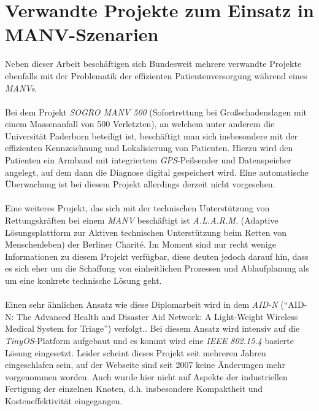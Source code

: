 \section{Verwandte Projekte zum Einsatz in MANV-Szenarien}\label{verwandte_projekte}
Neben dieser Arbeit beschäftigen sich Bundesweit mehrere verwandte Projekte ebenfalls mit der Problematik
der effizienten Patientenversorgung während eines \emph{MANVs}.\\
\\
Bei dem Projekt \emph{SOGRO MANV 500} (Sofortrettung bei Großschadenslagen mit einem Massenanfall von 500 Verletzten),
an welchem unter anderem die Universität Paderborn beteiligt ist, beschäftigt man sich insbesondere mit der effizienten
Kennzeichnung und Lokalisierung von Patienten. Hierzu wird den Patienten ein Armband mit integriertem \emph{GPS}-Peilsender 
und Datenspeicher angelegt, auf dem dann die Diagnose digital gespeichert wird. Eine automatische Überwachung ist bei
diesem Projekt allerdings derzeit nicht vorgesehen.\cite{sogro}\\
\\            
Eine weiteres Projekt, das sich mit der technischen Unterstützung von Rettungskräften bei einem \emph{MANV}
beschäftigt ist \emph{A.L.A.R.M.} (Adaptive Lösungsplattform zur Aktiven technischen Unterstützung beim Retten von 
Menschenleben) der Berliner Charité. Im Moment sind nur recht wenige Informationen zu diesem Projekt verfügbar, diese
deuten jedoch darauf hin, dass es sich eher um die Schaffung von einheitlichen Prozessen und Ablaufplanung als um eine
konkrete technische Lösung geht.\cite{alarm}\\
\\
Einen sehr ähnlichen Ansatz wie diese Diplomarbeit wird in dem \emph{AID-N} ("`AID-N: The Advanced Health and Disaster 
Aid Network: A Light-Weight Wireless Medical System for Triage"') verfolgt.\cite{aid-n}. Bei diesem Ansatz wird 
intensiv auf die \emph{TinyOS}-Platform aufgebaut und es kommt wird eine \emph{IEEE 802.15.4} basierte Lösung eingesetzt. 
Leider scheint dieses Projekt seit mehreren Jahren eingeschlafen sein, auf der Webseite sind seit 2007 keine Änderungen 
mehr vorgenommen worden. Auch wurde hier nicht auf Aspekte der industriellen Fertigung der einzelnen Knoten, d.h. 
insbesondere Kompaktheit und Kosteneffektivität eingegangen.
